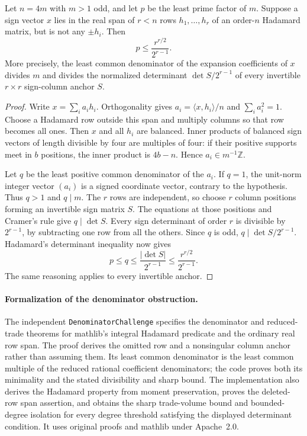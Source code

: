 \begin{theorem}\label{s04:trd:denom}
Let $n=4m$ with $m>1$ odd, and let $p$ be the least prime factor of $m$.
Suppose a sign vector $x$ lies in the real span of $r<n$ rows
$h_1,\ldots,h_r$ of an order-$n$ Hadamard matrix, but is not any
$\pm h_i$. Then
\begin{equation}\label{s04:trd:bound}
 p\le\frac{r^{r/2}}{2^{r-1}}.
\end{equation}
More precisely, the least common denominator of the expansion
coefficients of $x$ divides $m$ and divides the normalized determinant
$\det S/2^{r-1}$ of every invertible $r\times r$ sign-column anchor $S$.
\end{theorem}
\begin{proof}
Write $x=\sum_i a_i h_i$. Orthogonality gives
$a_i=\langle x,h_i\rangle/n$ and $\sum_i a_i^2=1$.
Choose a Hadamard row outside this span and multiply columns so that row
becomes all ones. Then $x$ and all $h_i$ are balanced. Inner products of
balanced sign vectors of length divisible by four are multiples of four:
if their positive supports meet in $b$ positions, the inner product is
$4b-n$. Hence $a_i\in m^{-1}\mathbb Z$.

Let $q$ be the least positive common denominator of the $a_i$.
If $q=1$, the unit-norm integer vector $(a_i)$ is a signed coordinate
vector, contrary to the hypothesis. Thus $q>1$ and $q\mid m$.
The $r$ rows are independent, so choose $r$ column positions forming an
invertible sign matrix $S$. The equations at those positions and Cramer's
rule give $q\mid\det S$. Every sign determinant of order $r$ is divisible
by $2^{r-1}$, by subtracting one row from all the others. Since $q$ is
odd, $q\mid\det S/2^{r-1}$. Hadamard's determinant inequality now gives
\[
 p\le q\le\frac{|\det S|}{2^{r-1}}
 \le\frac{r^{r/2}}{2^{r-1}}.
\]
The same reasoning applies to every invertible anchor.
\end{proof}

\paragraph{Formalization of the denominator obstruction.}
The independent \texttt{DenominatorChallenge} specifies the denominator
and reduced-trade theorems for
mathlib's integral Hadamard predicate and the ordinary real row span.
The proof derives the omitted row and a nonsingular column anchor rather
than assuming them. Its least common denominator is the least common
multiple of the reduced rational coefficient denominators; the code proves
both its minimality and the stated divisibility and sharp bound. The
implementation also derives the Hadamard property from moment preservation,
proves the deleted-row span assertion, and obtains the sharp trade-volume
bound and bounded-degree isolation for every degree threshold satisfying
the displayed determinant condition. It uses original proofs and mathlib
under Apache~2.0.


